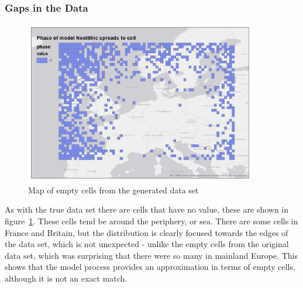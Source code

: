 \subsubsection{Gaps in the Data}
\begin{figure}
\begin{center}
	\includegraphics[width=0.9\textwidth]{figures/model-empty}
\end{center}
  \caption{Map of empty cells from the generated data set}
  \label{fig:model-empty}
\end{figure}

As with the true data set there are cells that have no value, these are shown in figure~\ref{fig:model-empty}. These cells tend be around the periphery, or sea. There are some cells in France and Britain, but the distribution is clearly focused towards the edges of the data set, which is not unexpected - unlike the empty cells from the original data set, which was surprising that there were so many in mainland Europe. This shows that the model process provides an approximation in terms of empty cells, although it is not an exact match.

